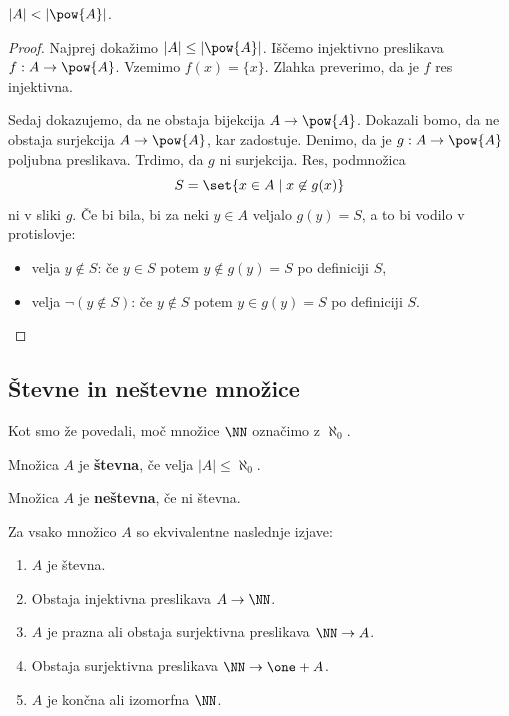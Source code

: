 \begin{izrek}[Cantor]
  $|A| < |\pow{A}|$.
\end{izrek}

\begin{proof}
  Najprej dokažimo $|A| \leq |\pow{A}|$. Iščemo injektivno preslikava $f : A \to \pow{A}$. Vzemimo $f(x) = \{x\}$. Zlahka preverimo, da je $f$ res injektivna.

  Sedaj dokazujemo, da ne obstaja bijekcija $A \to \pow{A}$. Dokazali bomo, da ne obstaja surjekcija $A \to \pow{A}$, kar zadostuje. Denimo, da je $g : A \to \pow{A}$ poljubna preslikava. Trdimo, da $g$ ni surjekcija. Res, podmnožica
  \begin{equation*}
    S = \set{x \in A \mid x \not\in g(x) }
  \end{equation*}
  ni v sliki $g$. Če bi bila, bi za neki $y \in A$ veljalo $g(y) = S$, a to bi vodilo v protislovje:
  \begin{itemize}
  \item velja $y \not\in S$: če $y \in S$ potem $y \not\in g(y) = S$ po definiciji $S$,
  \item velja $\lnot (y \not\in S)$: če $y \not\in S$ potem $y \in g(y) = S$ po definiciji $S$.
  \end{itemize}
\end{proof}


\subsection{Števne in neštevne množice}

Kot smo že povedali, moč množice $\NN$ označimo z $\aleph_0$.

\begin{definicija}
  Množica $A$ je \textbf{števna}, če velja $|A| \leq \aleph_0$.
\end{definicija}

\begin{definicija}
  Množica $A$ je \textbf{neštevna}, če ni števna.
\end{definicija}

\begin{izrek}
  Za vsako množico $A$ so ekvivalentne naslednje izjave:
  \begin{enumerate}
  \item $A$ je števna.
  \item Obstaja injektivna preslikava $A \to \NN$.
  \item $A$ je prazna ali obstaja surjektivna preslikava $\NN \to A$.
  \item Obstaja surjektivna preslikava $\NN \to \one + A$.
  \item $A$ je končna ali izomorfna $\NN$.
  \end{enumerate}
\end{izrek}

